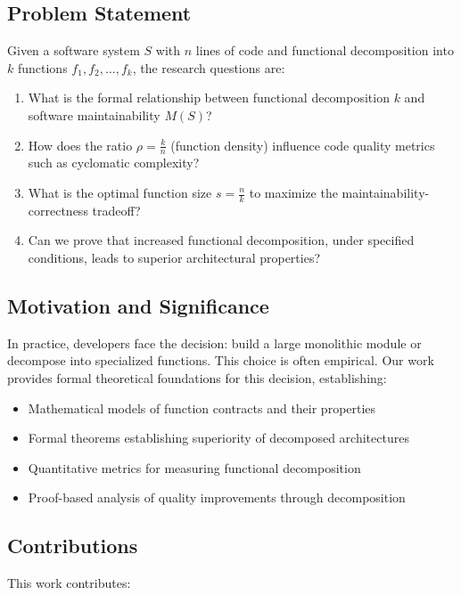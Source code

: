 \documentclass[a4paper,12pt]{article}
\theoremstyle{definition}
\begin{document}
\subsection{Problem Statement}

Given a software system $S$ with $n$ lines of code and functional decomposition into $k$ functions $f_1, f_2, \ldots, f_k$, the research questions are:

\begin{enumerate}
	\item What is the formal relationship between functional decomposition $k$ and software maintainability $M(S)$?
	\item How does the ratio $\rho = \frac{k}{n}$ (function density) influence code quality metrics such as cyclomatic complexity?
	\item What is the optimal function size $s = \frac{n}{k}$ to maximize the maintainability-correctness tradeoff?
	\item Can we prove that increased functional decomposition, under specified conditions, leads to superior architectural properties?
\end{enumerate}

\subsection{Motivation and Significance}

In practice, developers face the decision: build a large monolithic module or decompose into specialized functions. This choice is often empirical. Our work provides formal theoretical foundations for this decision, establishing:

\begin{itemize}
	\item Mathematical models of function contracts and their properties
	\item Formal theorems establishing superiority of decomposed architectures
	\item Quantitative metrics for measuring functional decomposition
	\item Proof-based analysis of quality improvements through decomposition
\end{itemize}

\subsection{Contributions}

This work contributes:
\end{document}
